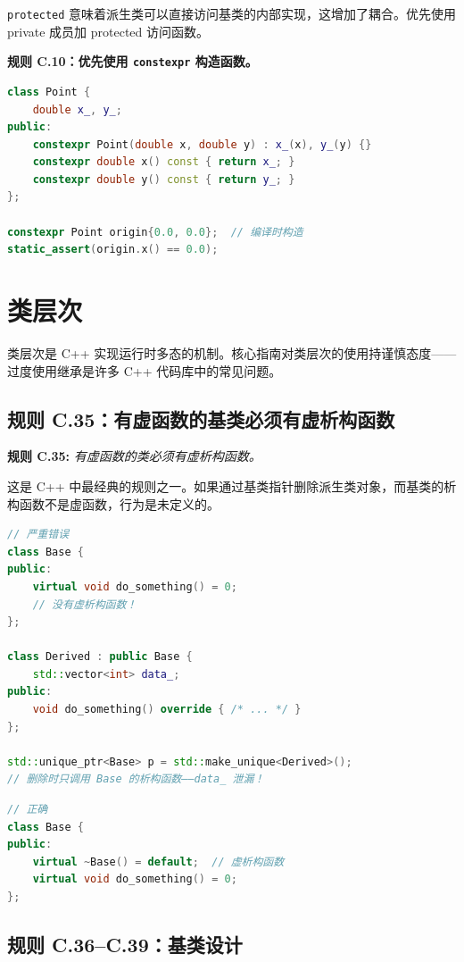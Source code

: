 \texttt{protected} 意味着派生类可以直接访问基类的内部实现，这增加了耦合。优先使用 private 成员加 protected 访问函数。

\textbf{规则 C.10：优先使用 \texttt{constexpr} 构造函数。}

\begin{lstlisting}[language=C++]
class Point {
    double x_, y_;
public:
    constexpr Point(double x, double y) : x_(x), y_(y) {}
    constexpr double x() const { return x_; }
    constexpr double y() const { return y_; }
};

constexpr Point origin{0.0, 0.0};  // 编译时构造
static_assert(origin.x() == 0.0);
\end{lstlisting}

\section{类层次}

类层次是 C++ 实现运行时多态的机制。核心指南对类层次的使用持谨慎态度——过度使用继承是许多 C++ 代码库中的常见问题。

\subsection{规则 C.35：有虚函数的基类必须有虚析构函数}

\textbf{规则 C.35:} \textit{有虚函数的类必须有虚析构函数。}

这是 C++ 中最经典的规则之一。如果通过基类指针删除派生类对象，而基类的析构函数不是虚函数，行为是未定义的。

\begin{lstlisting}[language=C++]
// 严重错误
class Base {
public:
    virtual void do_something() = 0;
    // 没有虚析构函数！
};

class Derived : public Base {
    std::vector<int> data_;
public:
    void do_something() override { /* ... */ }
};

std::unique_ptr<Base> p = std::make_unique<Derived>();
// 删除时只调用 Base 的析构函数——data_ 泄漏！
\end{lstlisting}

\begin{lstlisting}[language=C++]
// 正确
class Base {
public:
    virtual ~Base() = default;  // 虚析构函数
    virtual void do_something() = 0;
};
\end{lstlisting}

\subsection{规则 C.36--C.39：基类设计}

